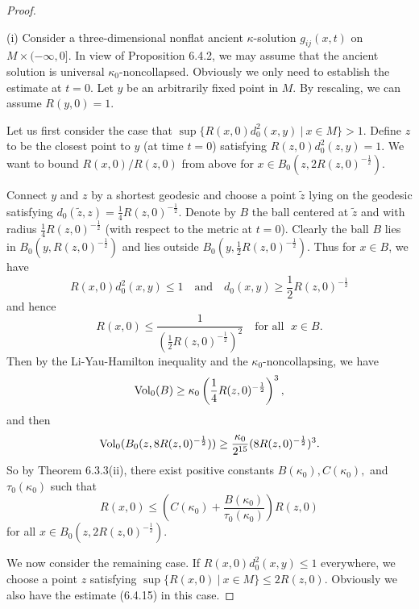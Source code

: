 \begin{proof}
   \

(i) Consider a three-dimensional nonflat ancient $\kappa$-solution
$g_{ij}(x,t)$ on $M \times (-\infty,0]$. In view of Proposition
6.4.2, we may assume that the ancient solution is universal
$\kappa_0$-noncollapsed. Obviously we only need to establish the
estimate at $t=0$. Let $y$ be an arbitrarily fixed point in $M$.
By rescaling, we can assume $R(y,0)=1$.

Let us first consider the case that $\sup\{R(x,0)d_0^2(x,y)\ |\
x\in M\}>1$. Define $z$ to be the closest point to $y$ (at time
$t=0$) satisfying $R(z,0)d_0^2(z,y)=1$. We want to bound
$R(x,0)/R(z,0)$ from above for $x\in
B_0(z,2R(z,0)^{-\frac{1}{2}}).$

Connect $y$ and $z$ by a shortest geodesic and choose a point
$\tilde{z}$ lying on the geodesic satisfying
$d_0(\tilde{z},z)=\frac{1}{4}R(z,0)^{-\frac{1}{2}}$. Denote by $B$
the ball centered at $\tilde{z}$ and with radius
$\frac{1}{4}R(z,0)^{-\frac{1}{2}}$ (with respect to the metric at
$t=0$). Clearly the ball $B$ lies in
$B_0(y,R(z,0)^{-\frac{1}{2}})$ and lies outside
$B_0(y,\frac{1}{2}R(z,0)^{-\frac{1}{2}})$. Thus for $x\in B$, we
have
$$
R(x,0)d_0^2(x,y)\le 1\quad \mbox{and} \quad
d_0(x,y)\ge\frac{1}{2}R(z,0)^{-\frac{1}{2}}
$$
and hence
$$
R(x,0)\le\frac{1}{(\frac{1}{2}R(z,0)^{-\frac{1}{2}})^2} \quad
\mbox{for all } \;x\in B.
$$
Then by the Li-Yau-Hamilton inequality and the
$\kappa_0$-noncollapsing, we have
$$
\operatorname{Vol}_0(B)\ge\kappa_0\left(\frac{1}{4}R(z,0)^{-\frac{1}{2}}\right)^3,
$$
and then
$$
\operatorname{Vol}_0(B_0(z,8R(z,0)^{-\frac{1}{2}}))
\ge\frac{\kappa_0}{2^{15}}(8R(z,0)^{-\frac{1}{2}})^3.
$$
So by Theorem 6.3.3(ii), there exist positive constants
$B(\kappa_0), C(\kappa_0),$ and $\tau_0(\kappa_0)$ such that \begin{equation}
R(x,0)\le (C(\kappa_0)+\frac{B(\kappa_0)}{\tau_0(\kappa_0)})R(z,0)
\end{equation} for all $x\in B_0(z,2R(z,0)^{-\frac{1}{2}})$.

We now consider the remaining case. If $R(x,0)d_0^2(x,y)\le 1$
everywhere, we choose a point $z$ satisfying $\sup\{R(x,0)\ |\
x\in M\}\leq2R(z,0)$. Obviously we also have the estimate (6.4.15)
in this case.


\end{proof}
